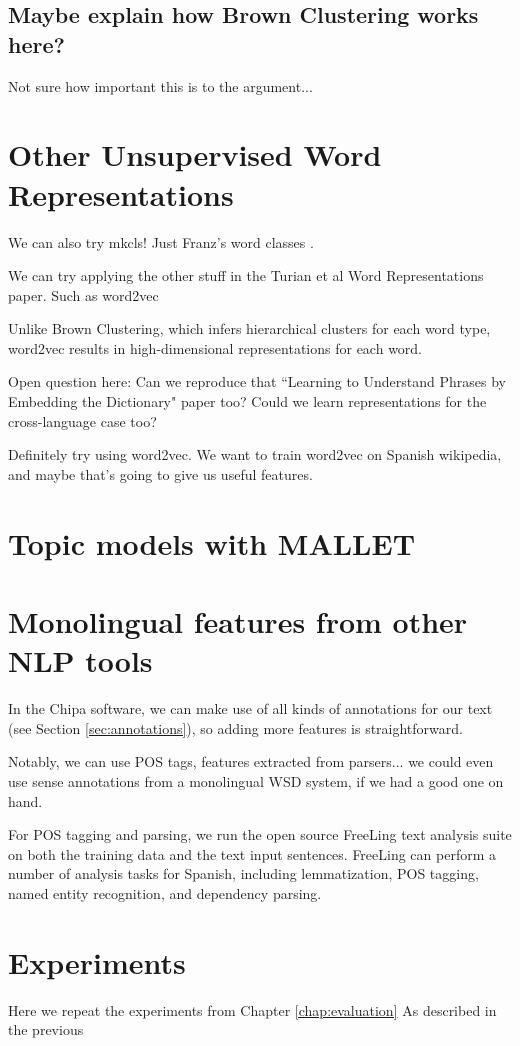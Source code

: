 \subsection{Maybe explain how Brown Clustering works here?}
Not sure how important this is to the argument...


\section{Other Unsupervised Word Representations}
We can also try mkcls! Just Franz's word classes \cite{och1999efficient}.


We can try applying the other stuff in the Turian et al Word Representations
paper. Such as word2vec \cite{mikolovword2vec}

Unlike Brown Clustering, which infers hierarchical clusters for each word type,
word2vec results in high-dimensional representations for each word.

Open question here:
Can we reproduce that ``Learning to Understand Phrases by Embedding the
Dictionary" paper too? Could we learn representations for the cross-language
case too?

Definitely try using word2vec. We want to train word2vec on Spanish wikipedia,
and maybe that's going to give us useful features.

\section{Topic models with MALLET}

\section{Monolingual features from other NLP tools}
In the Chipa software, we can make use of all kinds of annotations for our
text (see Section \ref{sec:annotations}), so adding more features is
straightforward.

Notably, we can use POS tags, features extracted from parsers... we could even
use sense annotations from a monolingual WSD system, if we had a good one on
hand.

For POS tagging and parsing, we run the open source FreeLing text analysis
suite \cite{padro12} on both the training data and the text input sentences.
FreeLing can perform a number of analysis tasks for Spanish, including
lemmatization, POS tagging, named entity recognition, and dependency parsing.

\section{Experiments}
Here we repeat the experiments from Chapter \ref{chap:evaluation}
As described in the previous
